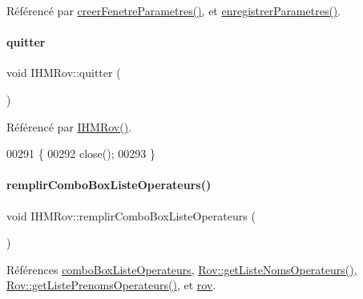 Référencé par \hyperlink{class_i_h_m_rov_aed451139ac09ef18b7c92637761d80ce}{creer\+Fenetre\+Parametres()}, et \hyperlink{class_i_h_m_rov_a94d31f4e748f3e4549eab42c8bc7e367}{enregistrer\+Parametres()}.

\mbox{\label{class_i_h_m_rov_a6446087033d8ead72d16451b4a29c44e}} 
\paragraph{\texorpdfstring{quitter}{quitter}}
{\footnotesize\ttfamily void I\+H\+M\+Rov\+::quitter (\begin{DoxyParamCaption}{ }\end{DoxyParamCaption})\hspace{0.3cm}{\ttfamily [slot]}}



Référencé par \hyperlink{class_i_h_m_rov_a5dac1fb4612866cc61f699a415e0ef6b}{I\+H\+M\+Rov()}.


\begin{DoxyCode}
00291 \{
00292     close();
00293 \}
\end{DoxyCode}
\mbox{\label{class_i_h_m_rov_a752a8dc2b3b68d536e94ff8bfb62f46f}} 
\paragraph{\texorpdfstring{remplir\+Combo\+Box\+Liste\+Operateurs()}{remplirComboBoxListeOperateurs()}}
{\footnotesize\ttfamily void I\+H\+M\+Rov\+::remplir\+Combo\+Box\+Liste\+Operateurs (\begin{DoxyParamCaption}{ }\end{DoxyParamCaption})\hspace{0.3cm}{\ttfamily [private]}}



Références \hyperlink{class_i_h_m_rov_a32ee4423982fa3a78e59167ed2354f6e}{combo\+Box\+Liste\+Operateurs}, \hyperlink{class_rov_ab585cb1f82344ba0a64a28488910b262}{Rov\+::get\+Liste\+Noms\+Operateurs()}, \hyperlink{class_rov_a128cae6dc19025017dea26663adde765}{Rov\+::get\+Liste\+Prenoms\+Operateurs()}, et \hyperlink{class_i_h_m_rov_a777ca33fdb295ba6b6773e880356fa1e}{rov}.



